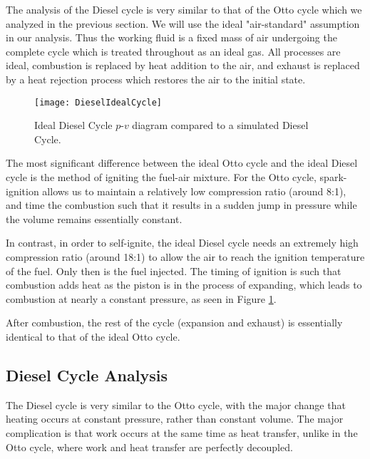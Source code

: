The analysis of the Diesel cycle is very similar to that of the Otto cycle which we analyzed in the previous section. We will use the ideal "air-standard" assumption in our analysis. Thus the working fluid is a fixed mass of air undergoing the complete cycle which is treated throughout as an ideal gas. All processes are ideal, combustion is replaced by heat addition to the air, and exhaust is replaced by a heat rejection process which restores the air to the initial state.

\begin{figure}[H]
\centering
\texttt{[image: DieselIdealCycle]}
\caption{Ideal Diesel Cycle $p$-$v$ diagram compared to a simulated Diesel Cycle.}
\label{fig:ch3_dieselCycle}
\end{figure}

The most significant difference between the ideal Otto cycle and the ideal Diesel cycle is the method of igniting the fuel-air mixture.  For the Otto cycle, spark-ignition allows us to maintain a relatively low compression ratio (around 8:1), and time the combustion such that it results in a sudden jump in pressure while the volume remains essentially constant.

In contrast, in order to self-ignite, the ideal Diesel cycle needs an extremely high compression ratio (around 18:1) to allow the air to reach the ignition temperature of the fuel. Only then is the fuel injected.  The timing of ignition is such that combustion adds heat as the piston is in the process of expanding, which leads to combustion at nearly a constant pressure, as seen in Figure \ref{fig:ch3_dieselCycle}.

After combustion, the rest of the cycle (expansion and exhaust) is essentially identical to that of the ideal Otto cycle.

\subsection{Diesel Cycle Analysis}

The Diesel cycle is very similar to the Otto cycle, with the major change that heating occurs at constant pressure, rather than constant volume.  The major complication is that work occurs at the same time as heat transfer, unlike in the Otto cycle, where work and heat transfer are perfectly decoupled.

